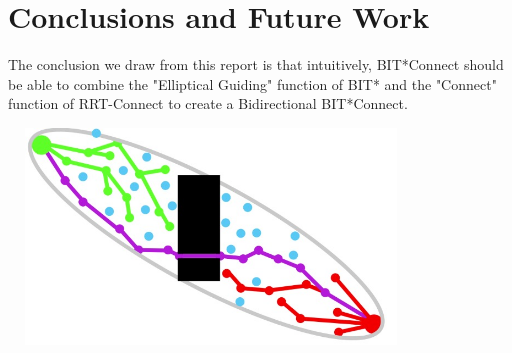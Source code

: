 \documentclass[12pt]{report}
\begin{document}





 
 

\chapter{Conclusions and Future Work}
The conclusion we draw from this report is that intuitively, BIT*Connect should be able to combine the "Elliptical Guiding" function of BIT* and the "Connect" function of RRT-Connect to create a Bidirectional BIT*Connect.
\vspace{5pt}

\includegraphics[height=5.75cm,width = 10.75cm]{bitconnect.png}
\end{document}
